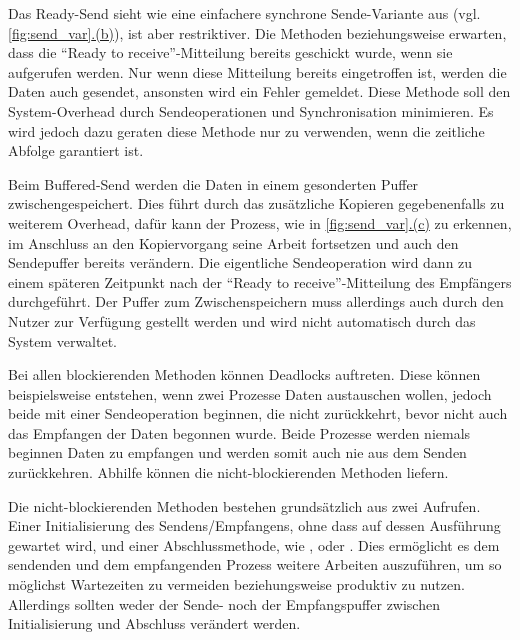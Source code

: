     Das Ready-Send sieht wie eine einfachere synchrone Sende-Variante aus (vgl. \autoref{fig:send_var}\hyperref[fig:ready_send]{.(b)}), ist aber restriktiver. Die Methoden 
    beziehungsweise  erwarten, dass die ``Ready to receive''-Mitteilung bereits geschickt wurde, wenn sie aufgerufen werden. Nur wenn diese Mitteilung bereits eingetroffen
    ist, werden die Daten auch gesendet, ansonsten wird ein Fehler gemeldet. Diese Methode soll den System-Overhead durch Sendeoperationen und Synchronisation minimieren. Es wird jedoch 
    dazu geraten diese Methode nur zu verwenden, wenn die zeitliche Abfolge garantiert ist. \citep{mpi_p2p, mpiv31}
    
    Beim Buffered-Send werden die Daten in einem gesonderten Puffer zwischengespeichert. Dies führt durch das zusätzliche Kopieren gegebenenfalls zu weiterem Overhead, dafür kann der 
    Prozess, wie in \autoref{fig:send_var}\hyperref[fig:buff_send]{.(c)} zu erkennen, im Anschluss an den Kopiervorgang seine Arbeit fortsetzen und auch den Sendepuffer bereits verändern. 
    Die eigentliche Sendeoperation wird dann zu einem späteren Zeitpunkt nach der ``Ready to receive''-Mitteilung des Empfängers durchgeführt. Der Puffer zum Zwischenspeichern muss allerdings 
    auch durch den Nutzer zur Verfügung gestellt werden und wird nicht automatisch durch das System verwaltet. \citep{mpi_p2p, mpiv31}
    
    Bei allen blockierenden Methoden können Deadlocks auftreten. Diese können beispielsweise entstehen, wenn zwei Prozesse Daten austauschen wollen, jedoch beide mit einer Sendeoperation
    beginnen, die nicht zurückkehrt, bevor nicht auch das Empfangen der Daten begonnen wurde. Beide Prozesse werden niemals beginnen Daten zu empfangen und werden somit auch
    nie aus dem Senden zurückkehren. Abhilfe können die nicht-blockierenden Methoden liefern.
    
    Die nicht-blockierenden Methoden bestehen grundsätzlich aus zwei Aufrufen. Einer Initialisierung des Sendens/Empfangens, ohne dass auf dessen Ausführung gewartet wird, und
    einer Abschlussmethode, wie ,  oder . Dies ermöglicht es dem sendenden und dem empfangenden Prozess weitere Arbeiten auszuführen,
    um so möglichst Wartezeiten zu vermeiden beziehungsweise produktiv zu nutzen. Allerdings sollten weder der Sende- noch der Empfangspuffer zwischen Initialisierung und Abschluss
    verändert werden. \citep{mpi_p2p, mpiv31}
    
